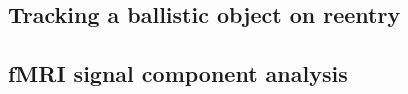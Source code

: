 \subsection{Tracking a ballistic object on reentry}
\parencite{ristic2004beyond,Ratna2008,Lindsten2010}

\subsection{fMRI signal component analysis}
\parencite{Sarkka2012}

